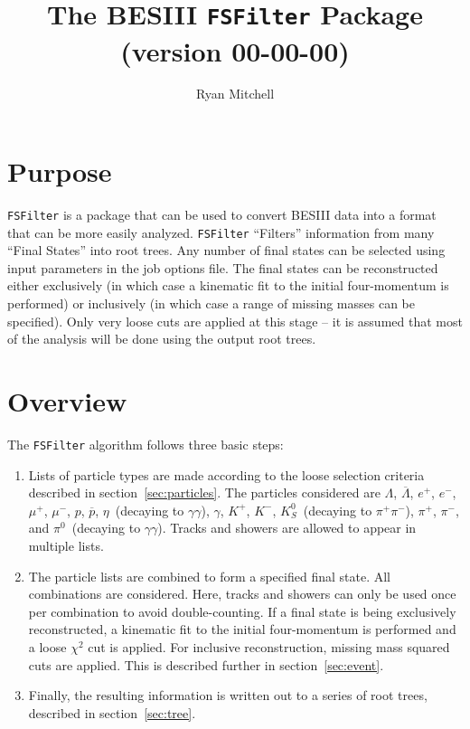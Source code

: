 \documentclass[11pt]{article}
\begin{document}
\title{The BESIII {\tt FSFilter} Package\\ (version 00-00-00)}
\author{Ryan Mitchell}
\maketitle


\tableofcontents

\parindent 0pt
\parskip 10pt


\section{Purpose}

{\tt FSFilter} is a package that can be used to convert BESIII data into a format that can be more easily analyzed.  {\tt FSFilter} ``Filters'' information from many ``Final States'' into root trees.  Any number of final states can be selected using input parameters in the job options file.  The final states can be reconstructed either exclusively (in which case a kinematic fit to the initial four-momentum is performed) or inclusively (in which case a range of missing masses can be specified).  Only very loose cuts are applied at this stage -- it is assumed that most of the analysis will be done using the output root trees.

\section{Overview}

The {\tt FSFilter} algorithm follows three basic steps:
\begin{enumerate}
\item{Lists of particle types are made according to the loose selection criteria described in section~\ref{sec:particles}.  The particles considered are $\Lambda$, $\overline{\Lambda}$, $e^+$, $e^-$, $\mu^+$, $\mu^-$, $p$, $\overline{p}$, $\eta$~(decaying to $\gamma\gamma$), $\gamma$, $K^+$, $K^-$, $K^0_S$~(decaying to $\pi^+\pi^-$), $\pi^+$, $\pi^-$, and $\pi^0$~(decaying to $\gamma\gamma$).  Tracks and showers are allowed to appear in multiple lists.}
\item{The particle lists are combined to form a specified final state.  All combinations are considered.  Here, tracks and showers can only be used once per combination to avoid double-counting.  If a final state is being exclusively reconstructed, a kinematic fit to the initial four-momentum is performed and a loose $\chi^2$ cut is applied.  For inclusive reconstruction, missing mass squared cuts are applied.  This is described further in section~\ref{sec:event}.}
\item{Finally, the resulting information is written out to a series of root trees, described in section~\ref{sec:tree}.}
\end{enumerate}
\end{document}
